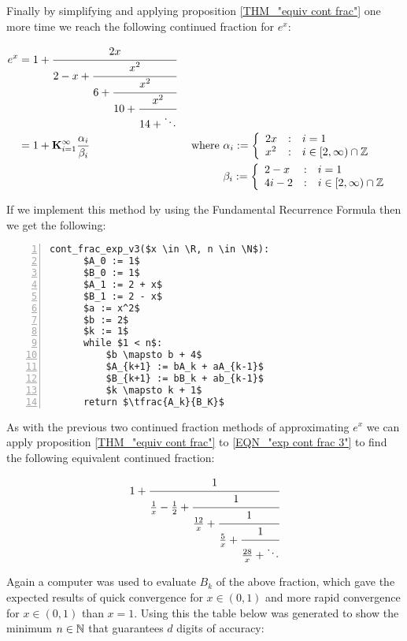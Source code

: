 Finally by simplifying and applying proposition \ref{THM_"equiv cont frac"} one more time we reach the following continued fraction for \(e^x\):

\begin{align}
e^x &= 1 + \cfrac{2x}{2-x+
		   \cfrac{x^2}{6 +
		   \cfrac{x^2}{10+
		   \cfrac{x^2}{14+\ddots} } } } \label{EQN_"exp cont frac 3"}\\
	&= 1 + \mathbf{K}_{i=1}^\infty \frac{\alpha_i}{\beta_i}
		&\textrm{ where }
		&\alpha_i := \left\{\begin{array}{lcl}
			2x &:& i = 1\\
			x^2 &:& i \in [2, \infty)\cap\mathbb{Z}
			\end{array}\right.\nonumber\\
	&&	&\beta_i := \left\{\begin{array}{lcl}
			2 - x &:& i = 1\\
			4i - 2 &:& i \in [2, \infty)\cap \mathbb{Z}
			\end{array}\right.\nonumber
\end{align}

If we implement this method by using the Fundamental Recurrence Formula then we get the following:

\begin{lstlisting}[numbers=left,frame=single,mathescape,caption={Continued fraction for \(e^x\) version 3},label={PCD_"cont exp v3"}]
  cont_frac_exp_v3($x \in \R, n \in \N$):
      $A_0 := 1$
      $B_0 := 1$
      $A_1 := 2 + x$
      $B_1 := 2 - x$
      $a := x^2$
      $b := 2$
      $k := 1$
      while $1 < n$:
          $b \mapsto b + 4$
          $A_{k+1} := bA_k + aA_{k-1}$
          $B_{k+1} := bB_k + ab_{k-1}$
          $k \mapsto k + 1$
      return $\tfrac{A_k}{B_K}$
\end{lstlisting}

As with the previous two continued fraction methods of approximating \(e^x\) we can apply proposition \ref{THM_"equiv cont frac"} to \ref{EQN_"exp cont frac 3"} to find the following equivalent continued fraction:

\begin{displaymath}
	1 + \cfrac{1}{\frac{1}{x} - \frac{1}{2} +
		\cfrac{1}{\frac{12}{x} + 
		\cfrac{1}{\frac{5}{x} +
		\cfrac{1}{\frac{28}{x} + \ddots } } } }
\end{displaymath}

Again a computer was used to evaluate \(B_k\) of the above fraction, which gave the expected results of quick convergence for \(x \in (0,1)\) and more rapid convergence for \(x \in (0,1)\) than \(x = 1\). Using this the table below was generated to show the minimum \(n \in \mathbb{N}\) that guarantees \(d\) digits of accuracy:

